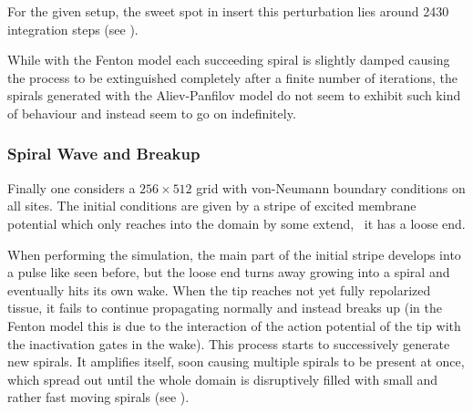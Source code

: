 For the given setup, the sweet spot in insert this perturbation lies around
2430 integration steps (see ).

While with the Fenton model each succeeding spiral is slightly damped causing
the process to be extinguished completely after a finite number of iterations,
the spirals generated with the Aliev-Panfilov model do not seem to exhibit such
kind of behaviour and instead seem to go on indefinitely.


\subsubsection{Spiral Wave and Breakup}
Finally one considers a $256\times512$ grid with von-Neumann boundary
conditions on all sites. The initial conditions are given by a stripe of
excited membrane potential which only reaches into the domain by some extend,
\ie~it has a loose end.

When performing the simulation, the main part of the initial stripe develops
into a pulse like seen before, but the loose end turns away growing into a
spiral and eventually hits its own wake. When the tip reaches not yet fully
repolarized tissue, it fails to continue propagating normally and instead
breaks up (in the Fenton model this is due to the interaction of the action
potential of the tip with the inactivation gates in the wake). This process
starts to successively generate new spirals. It amplifies itself, soon causing
multiple spirals to be present at once, which spread out until the whole domain
is disruptively filled with small and rather fast moving spirals (see
).

